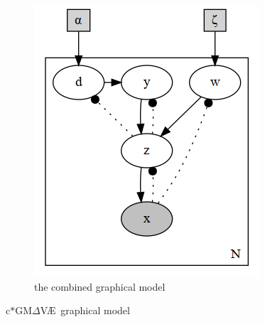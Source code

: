 \documentclass[final]{beamer}
\theoremstyle{plain}
\theoremstyle{definition}
\theoremstyle{remark}
\newcommand{\gmvae}{c$\ast$GM$\Delta$V\AE~}
\begin{document}
\begin{frame}
\begin{figure}[h]
\begin{subfigure}[b]{0.4\textwidth}
\includegraphics[width=\textwidth]{plots/dirichlet_gmm.gv.png}
\caption{the combined graphical model}
\end{subfigure}
\caption{\gmvae graphical model}
\label{fig:gmvae_model}
\end{figure}


\end{frame}
\end{document}
